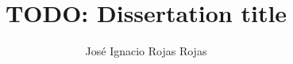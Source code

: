 \documentclass[doctor]{thesis}
\title{TODO: Dissertation title}
\author{José Ignacio Rojas Rojas}
\begin{document}
\ifdefined\ThesisPreviewChapter\else
\frontmatter %
\maketitle
\makemycopyright
\makeabstract
\tableofcontents
\fi

\mainmatter %




\backmatter %
\nocite{*}


\appendix %
\end{document}
